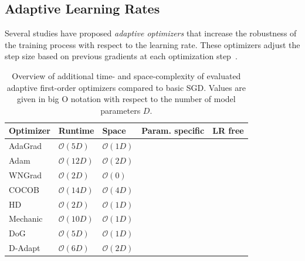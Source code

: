 \documentclass[runningheads]{llncs}
\newcommand{\cmark}{\ding{51}} %
\newcommand{\xmark}{\ding{55}} %
\begin{document}
\subsection{Adaptive Learning Rates}

Several studies have proposed \textit{adaptive optimizers} that increase the robustness of the training process with respect to the learning rate.
These optimizers adjust the step size based on previous gradients at each optimization step~\cite{duchiAdaptiveSubgradientMethods2011}.

\begin{table}[ht]
	\centering
	\scriptsize
	\caption{Overview of additional time- and space-complexity of evaluated adaptive first-order optimizers compared to basic SGD. Values are given in big O notation with respect to the number of model parameters $D$.}\label{tab:param_free_optims}
	\begin{tabular}{@{}lllcc@{}}
		\toprule
		Optimizer                & Runtime            & Space             & Param. specific & LR free \\ \midrule
		AdaGrad                  & $\mathcal{O}(5D)$  & $\mathcal{O}(1D)$ & \cmark          & \xmark  \\
		Adam                     & $\mathcal{O}(12D)$ & $\mathcal{O}(2D)$ & \cmark          & \xmark  \\
		WNGrad                   & $\mathcal{O}(2D)$  & $\mathcal{O}(0)$  & \xmark          & \xmark  \\
		COCOB                    & $\mathcal{O}(14D)$ & $\mathcal{O}(4D)$ & \cmark          & \cmark  \\
		HD \footnotemark[1]      & $\mathcal{O}(2D)$  & $\mathcal{O}(1D)$ & \xmark          & \xmark  \\
		Mechanic                 & $\mathcal{O}(10D)$ & $\mathcal{O}(1D)$ & \cmark          & \cmark  \\
		DoG \footnotemark[1]     & $\mathcal{O}(5D)$  & $\mathcal{O}(1D)$ & \xmark          & \cmark  \\
		D-Adapt \footnotemark[1] & $\mathcal{O}(6D)$  & $\mathcal{O}(2D)$ & \xmark          & \cmark  \\
		\bottomrule
	\end{tabular}
\end{table}
\end{document}
